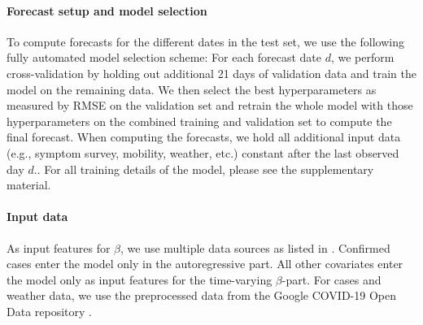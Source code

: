 \documentclass[nobib]{tufte-handout}
\newcommand{\bAR}{\ensuremath{\beta}\text{-AR}\xspace}
\begin{document}
\paragraph{Forecast setup and model selection} To compute forecasts for the
different dates in the test set, we use the following fully automated model
selection scheme: For each forecast date \(d\), we perform cross-validation by
holding out additional 21 days of validation data and train the model on the
remaining data. We then select the best hyperparameters as measured by RMSE on
the validation set and retrain the whole model with those hyperparameters on the
combined training and validation set to compute the final forecast. When
computing the forecasts, we hold all additional input data (e.g., symptom
survey, mobility, weather, etc.) constant after the last observed day
\(d\).. For all training details of the model,
please see the supplementary material.


\paragraph{Input data} As input features for \bAR, we use multiple data sources as listed in
. Confirmed cases enter the model only in the autoregressive
part. All other covariates enter the model only as input features for the
time-varying \(\beta\)-part. For cases and weather data, we use the preprocessed data
from the Google COVID-19 Open Data repository \citep{data/Wahltinez2020}.
\end{document}
